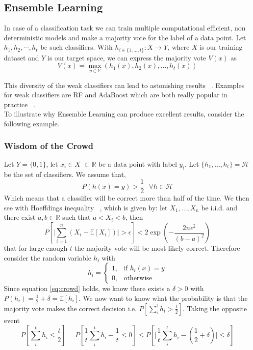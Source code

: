 \subsection{Ensemble Learning}

In case of a classification task we can train multiple computational efficient, non deterministic models and make a majority vote for the label of a data point. Let $h_1, h_2, \cdots , h_t$ be such classifiers. With $h_{i \in \{1, \dots, t\}}: X \rightarrow Y$, where $X$ is our training dataset and $Y$ is our target space, we can express the majority vote $V(x)$ as 
\begin{equation}
    V(x) = \max_{y \in Y} (h_1(x), h_2(x) , \dots , h_t(x) )
\end{equation}

This diversity of the weak classifiers can lead to astonishing results ~\cite{book}. Examples for weak classifiers are RF and AdaBoost which are both really popular in practice ~\cite{book}.\\
To illustrate why Ensemble Learning can produce excellent results, consider the following example. 
\subsubsection{Wisdom of the Crowd}
Let $Y = \{0,1\}$, let $x_i \in X$ $\subset \mathbb{R}$ be a data point with label $y_i$. Let $\{h_1, \dots , h_t \} = \mathcal{H}$ be the set of classifiers. We assume that,
\begin{equation}
    P(h(x) = y) > \frac{1}{2} \text{ } \forall h \in \mathcal{H}
\label{eq:crowd}    
\end{equation}
Which means that a classifier will be correct more than half of the time.
We then see with Hoeffdings inequality ~\cite{book}, which is given by:
let $X_1, \dots, X_n $ be i.i.d. and there exist $a,b \in \mathbb{R}$ such that $a< X_i <b$, then 
\begin{equation}
    P \left[ \lvert \sum_{i=1}^n (X_i - \mathbb{E}[X_i])\rvert > \epsilon  \right] < 2 \exp \left ( - \frac{2n\epsilon^2}{(b-a)^2} \right )
\label{eq:Hoeffding}    
\end{equation}
that for large enough $t$ the majority vote will be most likely correct. Therefore consider the random variable $h_i$ with 
\begin{equation}
    h_i = 
    \begin{cases}
    1,& \text{if } h_i(x) = y\\
    0,              & \text{otherwise}
\end{cases}
\end{equation}
Since equation \eqref{eq:crowd} holds, we know there exists a $\delta > 0$ with 
$P(h_i) = \frac{1}{2} + \delta = \mathbb{E}[h_i]$. We now want to know what the probability is that the majority vote makes the correct decision i.e. $P\left [\sum_i^t h_i > \frac{t}{2} \right ]$. Taking the opposite event 
\begin{equation*}
    P \left [ \sum_i^t h_i \leq \frac{t}{2} \right] = P \left [ \frac{1}{t} \sum_i^t h_i - \frac{1}{t} \leq 0 \right] \leq P \left [ \lvert \frac{1}{t} \sum_i^t h_i - (\frac{1}{2} + \delta ) \rvert \leq \delta \right]
\end{equation*}

